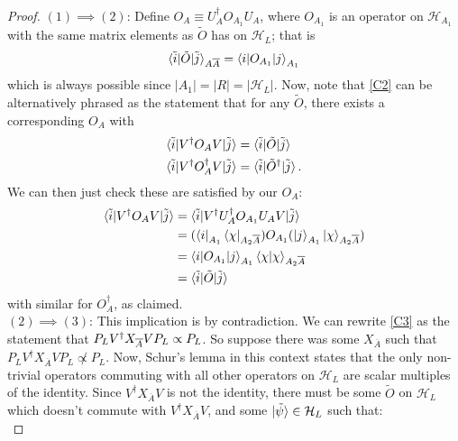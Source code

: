 \documentclass[12pt,a4paper]{report}
\numberwithin{equation}{section}
\newcommand{\ol}[1]{\overline{#1}}
\theoremstyle{definition}
\theoremstyle{theorem}
\theoremstyle{theorem}
\theoremstyle{example}
\theoremstyle{definition}
\begin{document}
\begin{proof}
	$(1)\implies(2)$: Define $O_{A}\equiv U_{A}^{\dagger}O_{A_{1}}U_{A}$, where $O_{A_{1}}$ is an operator on $\mathcal{H}_{A_{1}}$ with the same matrix elements as $\tilde{O}$ has on $\mathcal{H}_{L}$; that is
	\begin{equation*}
		\braket{\tilde{i}|\tilde{O}|\tilde{j}}_{A\ol{A}}=\braket{i|O_{A_{1}}|j}_{A_{1}}
	\end{equation*}
	which is always possible since $|A_{1}|=|R|=|\mathcal{H}_{L}|$. Now, note that \ref{C2} can be alternatively phrased as the statement that for any $\tilde{O}$, there exists a corresponding $O_{A}$ with
	\begin{equation}
		\begin{aligned}
			\braket{\tilde{i}|V^{\dagger}O_{A}V|\tilde{j}}&=\braket{\tilde{i}|\tilde{O}|\tilde{j}}\\
			\braket{\tilde{i}|V^{\dagger}O_{A}^{\dagger}V|\tilde{j}}&=\braket{\tilde{i}|\tilde{O}^{\dagger}|\tilde{j}}.
		\end{aligned}
	\end{equation}
	We can then just check these are satisfied by our $O_{A}$:
	\begin{equation}
		\begin{aligned}
			\braket{\tilde{i}|V^{\dagger}O_{A}V|\tilde{j}}&=\braket{\tilde{i}|V^{\dagger}U_{A}^{\dagger}O_{A_{1}}U_{A}V|\tilde{j}}\\&=(\bra{i}_{A_{1}}\bra{\chi}_{A_{2}\ol{A}})O_{A_{1}}(\ket{j}_{A_{1}}\ket{\chi}_{A_{2}\ol{A}})\\&=\braket{i|O_{A_{1}}|j}_{A_{1}}\braket{\chi|\chi}_{A_{2}\ol{A}}\\&=\braket{\tilde{i}|\tilde{O}|\tilde{j}}
		\end{aligned}
	\end{equation}
	with similar for $O_{A}^{\dagger}$, as claimed.\\
	$(2)\implies(3)$: This implication is by contradiction. We can rewrite \ref{C3} as the statement that $P_{L}V^{\dagger}X_{\overline{A}} VP_{L}\propto P_{L}$. So suppose there was some $X_{\ol{A}}$ such that $P_{L}V^{\dagger} X_{\ol{A}}VP_{L} \not\propto P_{L}$. Now, Schur's lemma in this context states that the only non-trivial operators commuting with all other operators on $\mathcal{H}_{L}$ are scalar multiples of the identity. Since $V^{\dagger}X_{\ol{A}}V$ is not the identity, there must be some $\tilde{O}$ on $\mathcal{H}_{L}$ which doesn't commute with $V^{\dagger}X_{\ol{A}}V$, and some $\ket{\tilde{\psi}}\in\mathcal{H}_{L}$ such that:
	\begin{equation}

\end{equation}
\end{proof}
\end{document}
